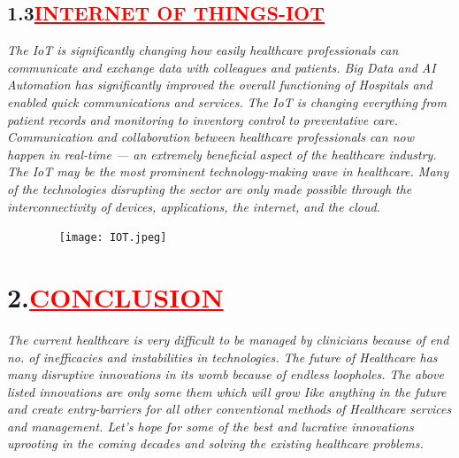 \documentclass[12pt]{article}
\begin{document}
\subsection*{\textbf{\hspace{1cm}1.3\hspace{1cm}\textcolor{red}{\underline{\huge {INTERNET OF THINGS-IOT}}}}}
\hspace{1cm}\large{\emph{The IoT is significantly changing how easily healthcare professionals can communicate and exchange data with colleagues and patients. Big Data and AI Automation has significantly improved the overall functioning of Hospitals and enabled quick communications and services.}}\vspace{1cm}\newline
\hspace{1cm}\large{\emph{The IoT is changing everything from patient records and monitoring to inventory control to preventative care. Communication and collaboration between healthcare professionals can now happen in real-time — an extremely beneficial aspect of the healthcare industry. The IoT may be the most prominent technology-making wave in healthcare. Many of the technologies disrupting the sector are only made possible through the interconnectivity of devices, applications, the internet, and the cloud.}}  
\begin{figure}
    \centering
    \texttt{[image: IOT.jpeg]}
\end{figure}
\section*{\textbf{2.\hspace{1cm}\textcolor{red}{\underline{\huge{CONCLUSION}}}}}
\hspace{1cm}\large{\emph{The current healthcare is very difficult to be managed by clinicians because of end no. of inefficacies and instabilities in technologies. The future of Healthcare has many disruptive innovations in its womb because of endless loopholes. The above listed innovations are only some them which will grow Iike anything in the future and create entry-barriers for all other conventional methods of Healthcare services and management. Let's hope for some of the best and lucrative innovations uprooting in the coming decades and solving the existing healthcare problems.}} 
\end{document}
